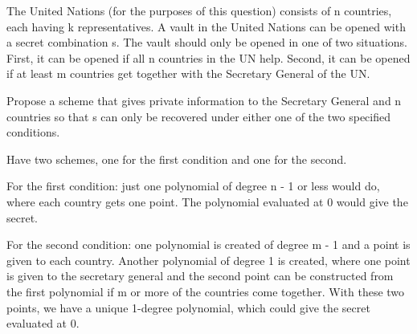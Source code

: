 \question The United Nations (for the purposes of this question) consists of n countries, each having k representatives.
A vault in the United Nations can be opened with a secret combination s. The vault should
only be opened in one of two situations. First, it can be opened if all n countries in the UN help.
Second, it can be opened if at least m countries get together with the Secretary General of the UN.

Propose a scheme that gives private information to the Secretary General and n countries so that s can
only be recovered under either one of the two specified conditions.

 
\begin{solution}
Have two schemes, one for the first condition and one for the second.

For the first condition: just one polynomial of degree n - 1 or less would do, where each country gets one point. The polynomial evaluated at 0 would give the secret.

For the second condition: one polynomial is created of degree m - 1 and a point is given to each
country. Another polynomial of degree 1 is created, where one point is given to the secretary general
and the second point can be constructed from the first polynomial if m or more of the countries come
together. With these two points, we have a unique 1-degree polynomial, which could give the secret
evaluated at 0.
\end{solution}
\newpage